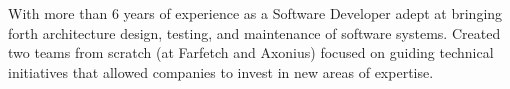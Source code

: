 

\begin{cvparagraph}

With more than 6 years of experience as a Software Developer adept at bringing forth architecture design, testing, and maintenance of software systems.
Created two teams from scratch (at Farfetch and Axonius) focused on guiding technical initiatives that allowed companies to invest in new areas of expertise.
\end{cvparagraph}
